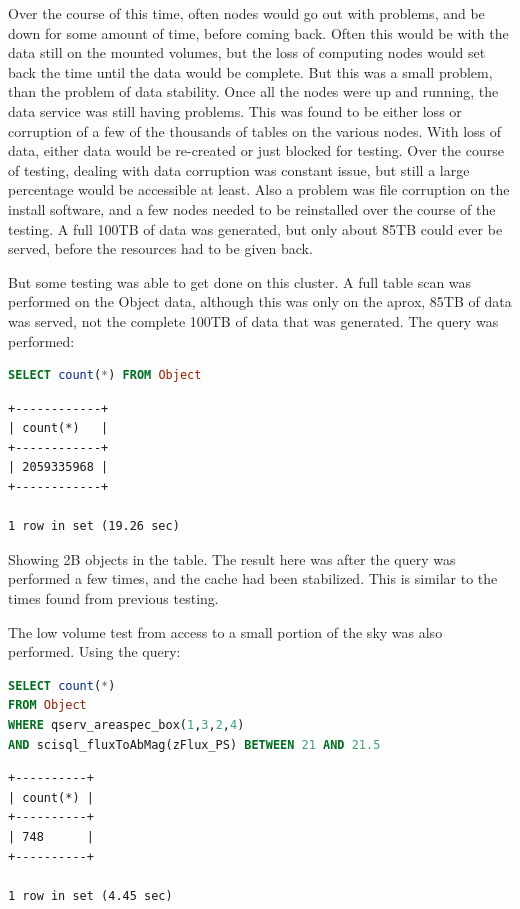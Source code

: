 \documentclass[DM,lsstdraft,toc]{lsstdoc}
\begin{document}
Over the course of this time, often nodes would go out with problems,
and be down for some amount of time, before coming back. Often this
would be with the data still on the mounted volumes, but the loss of
computing nodes would set back the time until the data would be
complete. But this was a small problem, than the problem of data
stability. Once all the nodes were up and running, the data service was
still having problems. This was found to be either loss or corruption of
a few of the thousands of tables on the various nodes. With loss of
data, either data would be re-created or just blocked for testing. Over
the course of testing, dealing with data corruption was constant issue,
but still a large percentage would be accessible at least. Also a
problem was file corruption on the install software, and a few nodes
needed to be reinstalled over the course of the testing. A full 100TB of
data was generated, but only about 85TB could ever be served, before the
resources had to be given back.

But some testing was able to get done on this cluster. A full table scan
was performed on the Object data, although this was only on the aprox,
85TB of data was served, not the complete 100TB of data that was
generated. The query was performed:

\begin{lstlisting}[language=SQL]
SELECT count(*) FROM Object
\end{lstlisting}

\begin{verbatim}
+------------+
| count(*)   |
+------------+
| 2059335968 |
+------------+

1 row in set (19.26 sec)
\end{verbatim}

Showing 2B objects in the table. The result here was after the query was
performed a few times, and the cache had been stabilized. This is
similar to the times found from previous testing.

The low volume test from access to a small portion of the sky was also
performed. Using the query:

\begin{lstlisting}[language=SQL]
SELECT count(*)
FROM Object
WHERE qserv_areaspec_box(1,3,2,4)
AND scisql_fluxToAbMag(zFlux_PS) BETWEEN 21 AND 21.5
\end{lstlisting}

\begin{verbatim}
+----------+
| count(*) |
+----------+
| 748      |
+----------+

1 row in set (4.45 sec)
\end{verbatim}
\end{document}
